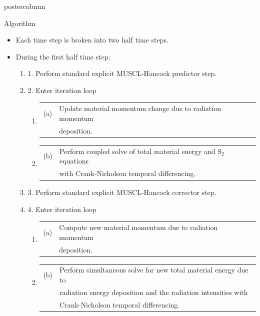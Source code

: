 \documentclass[xcolor=dvipsnames]{beamer}
\begin{document}
\begin{frame}
\begin{columns}
\begin{column}{.49\textwidth}
\begin{beamercolorbox}[center,wd=\textwidth]{postercolumn}
\begin{minipage}[T]{0.95\textwidth}
{    
    \begin{block}{Algorithm}
        \setlength\itemsep{0.2em}
	  \begin{itemize} 
    \item Each time step is broken into two half time steps.
    \item During the first half time step:
      \begin{enumerate}
        \item 1. Perform standard explicit MUSCL-Hancock predictor step.
        \item 2. Enter iteration loop
        \begin{enumerate}
          \item \begin{tabular}{c l}(a)&Update material momentum change due to radiation momentum\\
                 & deposition.\end{tabular}
          \item \begin{tabular}{c l}(b)&Perform coupled solve of total material energy and S$_2$ equations
                \\&with Crank-Nicholson temporal differencing.\end{tabular}
        \end{enumerate}
        \item 3. Perform standard explicit MUSCL-Hancock corrector step.
        \item 4. Enter iteration loop
        \begin{enumerate}
          \item \begin{tabular}{c l}(a)&Compute new material momentum due to radiation momentum\\&deposition.\end{tabular}
          \item \begin{tabular}{c l}(b)&Perform simultaneous solve for new total material energy due to \\
             &radiation energy deposition and the radiation intensities with \\&Crank-Nicholson temporal differencing.\end{tabular}
        \end{enumerate}
      \end{enumerate}

\end{itemize}
\end{block}}
\end{minipage}
\end{beamercolorbox}
\end{column}
\end{columns}
\end{frame}
\end{document}
